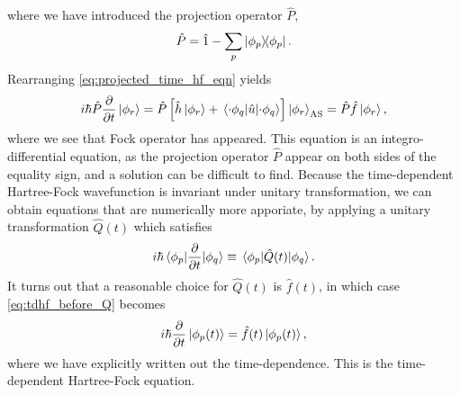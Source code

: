 where we have introduced the projection operator $\hat{P}$, 
\begin{equation}
    \hat{P} = \hat{1} - \sum_p \outerproduct{\phi_p}.
\end{equation}
Rearranging \autoref{eq:projected_time_hf_eqn} yields
\begin{equation}
    \label{eq:tdhf_before_Q}
    i\hbar \hat{P}\frac{\partial}{\partial t} \ket{\phi_r} 
    = \hat{P}\left[\hat{h}\ket{\phi_r} 
        + \mel{\cdot\phi_q}{\hat{u}}{\cdot\phi_q} \right]\ket{\phi_r}_\text{AS}
    = \hat{P}\hat{f}\ket{\phi_r},
\end{equation}
where we see that Fock operator has appeared. This equation is an integro-differential 
equation, as the projection operator $\hat{P}$ appear on both sides of the equality 
sign, and a solution can be difficult to find. Because the time-dependent Hartree-Fock 
wavefunction is invariant under unitary transformation, we can obtain equations that are 
numerically more apporiate, by applying a unitary transformation $\hat{Q}(t)$ which 
satisfies
\begin{equation}
    i\hbar\mel{\phi_p}{\frac{\partial}{\partial t}}{\phi_q}
    \equiv \mel{\phi_p}{\hat{Q}(t)}{\phi_q}.
\end{equation}
It turns out that a reasonable choice for $\hat{Q}(t)$ is $\hat{f}(t)$, in which case 
\autoref{eq:tdhf_before_Q} becomes
\begin{equation}
    \label{eq:tdhf_eqn}
    i\hbar\frac{\partial}{\partial t}\ket{\phi_p(t)} = \hat{f}(t)\ket{\phi_p(t)},
\end{equation}
where we have explicitly written out the time-dependence. This is the time-dependent 
Hartree-Fock equation.

